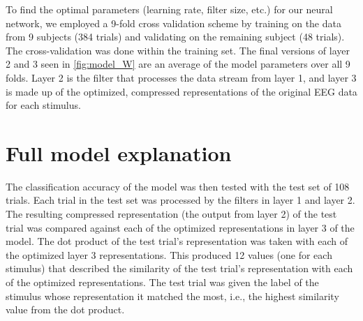 To find the optimal parameters (learning rate, filter size, etc.) for our neural network, we employed a 9-fold cross validation scheme by training on the data from 9 subjects (384 trials) and validating on the remaining subject (48 trials).
The cross-validation was done within the training set. %
The final versions of layer 2 and 3 seen in \autoref{fig:model_W} are an average of the model parameters over all 9 folds.
Layer 2 is the filter that processes the data stream from layer 1, and layer 3 is made up of the optimized, compressed representations of the original EEG data for each stimulus.
\section{Full model explanation}
The classification accuracy of the model was then tested with the test set of 108 trials. 
Each trial in the test set was processed by the filters in layer 1 and layer 2. 
The resulting compressed representation (the output from layer 2) of the test trial was compared against each of the optimized representations in layer 3 of the model.
The dot product of the test trial's representation was taken with each of the optimized layer 3 representations.
This produced 12 values (one for each stimulus) that described the similarity of the test trial's representation with each of the optimized representations. 
The test trial was given the label of the stimulus whose representation it matched the most, i.e., the highest similarity value from the dot product. 
